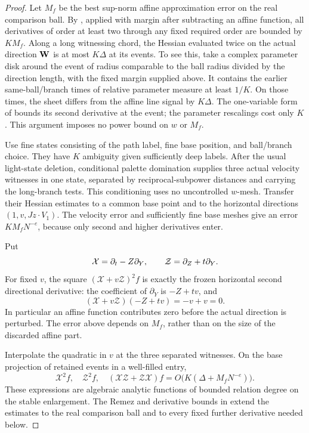 \begin{proof}
Let \(M_f\) be the best sup-norm affine approximation error on the real
comparison ball.  By , applied with margin
after subtracting an affine function, all derivatives of order at
least two through any fixed required order are bounded by \(KM_f\).
Along a long witnessing chord, the Hessian evaluated twice on the
actual direction \({\bf W}\) is at most \(K\Delta\) at its events.
To see this, take a complex parameter disk around the event of radius
comparable to the ball radius divided by the direction length, with
the fixed margin supplied above.  It contains the earlier
same-ball/branch times of relative parameter measure at least
\(1/K\).  On those times, the sheet differs from the affine line
signal by \(K\Delta\).  The one-variable form of
 bounds its second derivative at the event;
the parameter rescalings cost only \(K\).  This argument imposes no
power bound on \(w\) or \(M_f\).

Use fine states consisting of the path label, fine base position,
and ball/branch choice.  They have \(K\) ambiguity given sufficiently
deep labels.  After the usual light-state deletion, conditional
palette domination supplies three actual velocity witnesses in one
state, separated by reciprocal-subpower distances and carrying the
long-branch tests.  This conditioning uses no uncontrolled
\(w\)-mesh.  Transfer their Hessian estimates to a common base point
and to the horizontal directions \((1,v,Jz\cdot V_1)\).  The velocity
error and sufficiently fine base meshes give an error
\(KM_fN^{-e}\), because only second and higher derivatives enter.

Put
\[
 {\cal X}=\partial_t-Z\partial_Y,\qquad
 {\cal Z}=\partial_Z+t\partial_Y.
\]
For fixed \(v\), the square \((\mathcal X+v\mathcal Z)^2f\) is exactly
the frozen horizontal second directional derivative: the coefficient
of \(\partial_Y\) is \(-Z+tv\), and
\[
 (\mathcal X+v\mathcal Z)(-Z+tv)=-v+v=0.
\]
In particular an affine function contributes zero before the actual
direction is perturbed.  The error above depends on \(M_f\), rather
than on the size of the discarded affine part.

Interpolate the quadratic in \(v\) at the three separated witnesses.
On the base projection of retained events in a well-filled entry,
\[
 \mathcal X^2f,\quad \mathcal Z^2f,\quad
 (\mathcal X\mathcal Z+\mathcal Z\mathcal X)f
 =O\bigl(K(\Delta+M_fN^{-e})\bigr).
\]
These expressions are algebraic analytic functions of bounded
relation degree on the stable enlargement.  The Remez and derivative
bounds in  extend the estimates to the real
comparison ball and to every fixed further derivative needed below.


\end{proof}
